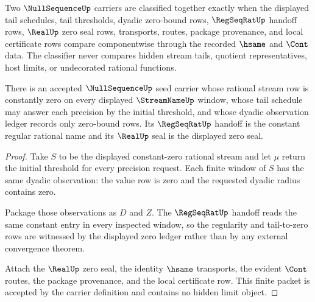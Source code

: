\begin{definition}
\label{def:nullsequence-classifier}
Two $\NullSequenceUp$ carriers are classified together exactly when the displayed tail schedules, tail thresholds, dyadic zero-bound rows, $\RegSeqRatUp$ handoff rows, $\RealUp$ zero seal rows, transports, routes, package provenance, and local certificate rows compare componentwise through the recorded $\hsame$ and $\Cont$ data. The classifier never compares hidden stream tails, quotient representatives, host limits, or undecorated rational functions.
\end{definition}

\begin{theorem}
\label{thm:nullsequence-zero-seed}
There is an accepted $\NullSequenceUp$ seed carrier whose rational stream row is constantly zero on every displayed $\StreamNameUp$ window, whose tail schedule may answer each precision by the initial threshold, and whose dyadic observation ledger records only zero-bound rows. Its $\RegSeqRatUp$ handoff is the constant regular rational name and its $\RealUp$ seal is the displayed zero seal.
\end{theorem}
\begin{proof}
Take $S$ to be the displayed constant-zero rational stream and let $\mu$ return the initial threshold for every precision request. Each finite window of $S$ has the same dyadic observation: the value row is zero and the requested dyadic radius contains zero.

Package those observations as $D$ and $Z$. The $\RegSeqRatUp$ handoff reads the same constant entry in every inspected window, so the regularity and tail-to-zero rows are witnessed by the displayed zero ledger rather than by any external convergence theorem.

Attach the $\RealUp$ zero seal, the identity $\hsame$ transports, the evident $\Cont$ routes, the package provenance, and the local certificate row. This finite packet is accepted by the carrier definition and contains no hidden limit object.
\end{proof}

